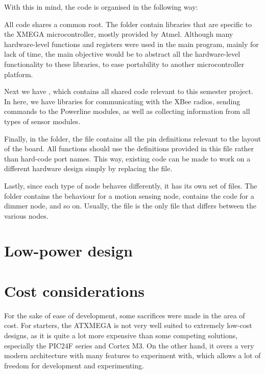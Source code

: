 With this in mind, the code is organised in the following way:


All code shares a common root. The folder  contain libraries
that are specific to the XMEGA microcontroller, mostly provided by Atmel.
Although many hardware-level functions and registers were used in the main
program, mainly for lack of time, the main objective would be to abstract all
the hardware-level functionality to these libraries, to ease portability to
another microcontroller platform.

Next we have , which contains all shared code relevant to
this semester project. In here, we have libraries for communicating with the
XBee radios, sending commands to the Powerline modules, as well as collecting
information from all types of sensor modules.

Finally, in the  folder, the  file contains
all the pin definitions relevant to the layout of the board. All functions
should use the definitions provided in this file rather than hard-code port
names. This way, existing code can be made to work on a different hardware
design simply by replacing the  file.

Lastly, since each type of node behaves differently, it has its own set of
files. The  folder contains the behaviour for a motion
sensing node,  contains the code for a dimmer node, and so
on. Usually, the  file is the only file that differs between the
various nodes.

\section{Low-power design}

\section{Cost considerations}

For the sake of ease of development, some sacrifices were made in the area of
cost. For starters, the ATXMEGA is not very well suited to extremely low-cost
designs, as it is quite a lot more expensive than some competing solutions,
especially the PIC24F series and Cortex M3. On the other hand, it overs a very
modern architecture with many features to experiment with, which allows a lot of
freedom for development and experimenting.

